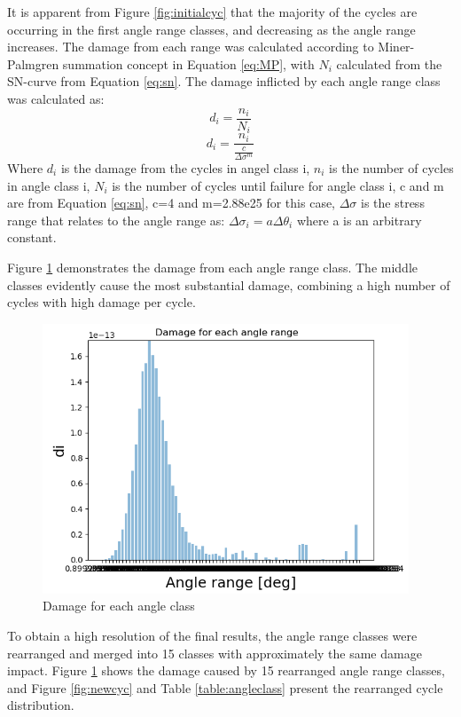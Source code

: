 \noindent It is apparent from Figure \ref{fig:initialcyc} that the majority of the cycles are occurring in the first angle range classes, and decreasing as the angle range increases.\newline
\newline
The damage from each range was calculated according to Miner-Palmgren summation concept in Equation \ref{eq:MP}, with $N_i$ calculated from the SN-curve from Equation \ref{eq:sn}. The damage inflicted by each angle range class was calculated as:
\begin{equation}
    d_i  = \frac{n_i}{N_i}
\end{equation}
\begin{equation}
    d_i=\frac{n_i}{\frac{c}{\Delta \sigma ^m}}
\end{equation}
Where $d_i$ is the damage from the cycles in angel class i, $n_i$ is the number of cycles in angle class i, $N_i$ is the number of cycles until failure for angle class i, c and m are from Equation \ref{eq:sn}, c=4 and m=2.88e25 for this case,  $\Delta \sigma$ is the stress range that relates to the angle range as: $\Delta \sigma_i = a \Delta \theta_i$ where a is an arbitrary constant.\newline
\newline 

Figure \ref{fig:initialdam} demonstrates the damage from each angle range class. The middle classes evidently cause the most substantial damage, combining a high number of cycles with high damage per cycle. 
\begin{figure}[H]
\centering
\includegraphics[scale=0.9]{figures/initialdam}
\caption[Damage for each angle class]{Damage for each angle class}
 \label{fig:initialdam}
\end{figure}
To obtain a high resolution of the final results, the angle range classes were rearranged and merged into 15 classes with approximately the same damage impact. Figure \ref{fig:initialdam} shows the damage caused by 15 rearranged angle range classes, and Figure \ref{fig:newcyc} and Table \ref{table:angleclass} present the rearranged cycle distribution.  

